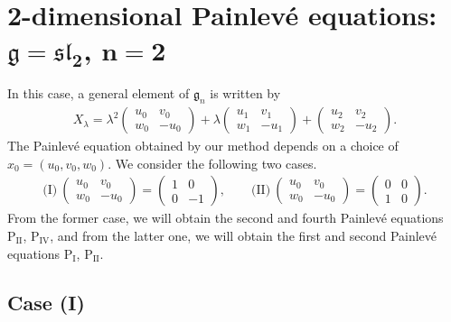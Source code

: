 \documentclass[pdftex]{sigma}
\numberwithin{equation}{section}
\begin{document}
\section[2-dimensional Painlev\'{e} equations: $\mathfrak{g} = \mathfrak{sl}_2$, $n=2$]{2-dimensional Painlev\'{e} equations: $\boldsymbol{\mathfrak{g} = \mathfrak{sl}_2}$, $\boldsymbol{n=2}$}\label{section3}

In this case, a general element of $\mathfrak{g}_n$ is written by
\begin{gather*}
X_\lambda = \lambda ^2 \left(
\begin{matrix}
u_0 & v_0 \\
w_0 & -u_0
\end{matrix}
\right) + \lambda \left(
\begin{matrix}
u_1 & v_1 \\
w_1 & -u_1
\end{matrix}
\right) + \left(
\begin{matrix}
u_2 & v_2 \\
w_2 & -u_2
\end{matrix}
\right).
\end{gather*}
The Painlev\'{e} equation obtained by our method depends on a choice of $x_0 = (u_0, v_0, w_0)$. We consider the following two cases.
\begin{gather*}
\text{(I)}\ \left(
\begin{matrix}
u_0 & v_0 \\
w_0 & -u_0
\end{matrix}
\right) = \left(
\begin{matrix}
1 & 0 \\
0 & -1
\end{matrix}
\right), \qquad \text{(II)}\ \left(
\begin{matrix}
u_0 & v_0 \\
w_0 & -u_0
\end{matrix}
\right) = \left(
\begin{matrix}
0 & 0 \\
1 & 0
\end{matrix}
\right).
\end{gather*}
From the former case, we will obtain the second and fourth Painlev\'{e} equations $\text{P}_\text{II}$, $\text{P}_\text{IV}$, and from the latter one, we will obtain the f\/irst and second Painlev\'{e} equations $\text{P}_\text{I}$, $\text{P}_\text{II}$.

\subsection{Case (I)}\label{section3.1}
\end{document}
